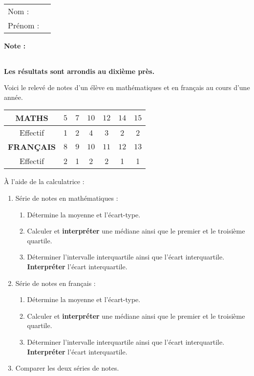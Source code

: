 \documentclass[10pt,french]{book}
\newcommand\competences{
\setcounter{exo}{0}
\begin{tabular}{ll} Nom : \\[5pt] Prénom : \end{tabular}
\hfill
\textbf{Note :}\renewcommand\arraystretch{2.3}
\begin{tabular}{|c|}
\hline
\slashbox{\Huge\bfseries\phantom{10}}{\Huge\bfseries 10}\\
\hline
\end{tabular}\renewcommand\arraystretch{1}\medskip
}
\begin{document}
\competences

\textbf{Les résultats sont arrondis au dixième près.}\par\medskip

\exo Voici le relevé de notes d'un élève en mathématiques et en français au cours d'une année.

\begin{center}
\renewcommand\arraystretch{1.5}
	\begin{tabular}{|*{7}{c|}}
	\hline
		{\bf MATHS} & $5$ & $7$ & $10$ & $12$ & $14$ & $15$  \\
    \hline
        Effectif & 1 & 2 & 4 & 3 & 2 & 2 \\
	\hline\hline
		{\bf FRAN\c CAIS} & $8$ & $9$ & $10$ & $11$ & $12$ & $13$ \\
	\hline
        Effectif & 2 & 1 & 2 & 2 & 1 & 1 \\
    \hline
	\end{tabular}
\end{center}

À l'aide de la calculatrice :
\begin{enumerate}
	\item Série de notes en mathématiques :
        \begin{enumerate}
            \item Détermine la moyenne et l'écart-type.
            \item Calculer et \textbf{interpréter} une médiane ainsi que le premier et le troisième quartile.
            \item Déterminer l'intervalle interquartile ainsi que l'écart interquartile. \textbf{Interpréter} l'écart interquartile.
        \end{enumerate}
    \item Série de notes en français :
        \begin{enumerate}
            \item Détermine la moyenne et l'écart-type.
            \item Calculer et \textbf{interpréter} une médiane ainsi que le premier et le troisième quartile.
            \item Déterminer l'intervalle interquartile ainsi que l'écart interquartile. \textbf{Interpréter} l'écart interquartile.
        \end{enumerate}
    \item Comparer les deux séries de notes.
\end{enumerate}\clearpage
\end{document}
